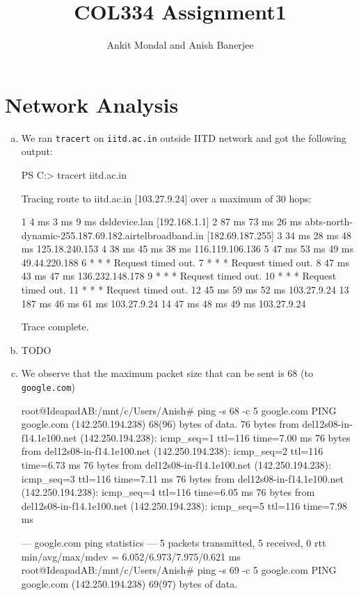\documentclass{article}
\title{COL334 Assignment1}
\author{Ankit Mondal and Anish Banerjee}
\begin{document}
\maketitle

\section{Network Analysis}
\begin{enumerate}[a.]
    \item We ran {\tt tracert} on {\tt iitd.ac.in} outside IITD network and got the following output:
    \begin{code}
PS C:\Users\Anish> tracert iitd.ac.in

Tracing route to iitd.ac.in [103.27.9.24]
over a maximum of 30 hops:

 1    4 ms    3 ms    9 ms dsldevice.lan [192.168.1.1]
 2   87 ms   73 ms   26 ms abts-north-dynamic-255.187.69.182.airtelbroadband.in [182.69.187.255]
 3   34 ms   28 ms   48 ms 125.18.240.153
 4   38 ms   45 ms   38 ms 116.119.106.136
 5   47 ms   53 ms   49 ms 49.44.220.188
 6    *       *       *    Request timed out.
 7    *       *       *    Request timed out.
 8   47 ms   43 ms   47 ms 136.232.148.178
 9    *       *       *    Request timed out.
10    *       *       *    Request timed out.
11    *       *       *    Request timed out.
12   45 ms   59 ms   52 ms 103.27.9.24
13  187 ms   46 ms   61 ms 103.27.9.24
14   47 ms   48 ms   49 ms 103.27.9.24

Trace complete.
    \end{code}
    \item TODO
    \item We observe that the maximum packet size that can be sent is 68 (to {\tt google.com})
\begin{code}
root@IdeapadAB:/mnt/c/Users/Anish# ping -s 68 -c 5 google.com
PING google.com (142.250.194.238) 68(96) bytes of data.
76 bytes from del12s08-in-f14.1e100.net (142.250.194.238): icmp_seq=1 ttl=116 time=7.00 ms
76 bytes from del12s08-in-f14.1e100.net (142.250.194.238): icmp_seq=2 ttl=116 time=6.73 ms
76 bytes from del12s08-in-f14.1e100.net (142.250.194.238): icmp_seq=3 ttl=116 time=7.11 ms
76 bytes from del12s08-in-f14.1e100.net (142.250.194.238): icmp_seq=4 ttl=116 time=6.05 ms
76 bytes from del12s08-in-f14.1e100.net (142.250.194.238): icmp_seq=5 ttl=116 time=7.98 ms

--- google.com ping statistics ---
5 packets transmitted, 5 received, 0%
rtt min/avg/max/mdev = 6.052/6.973/7.975/0.621 ms
root@IdeapadAB:/mnt/c/Users/Anish# ping -s 69 -c 5 google.com
PING google.com (142.250.194.238) 69(97) bytes of data.


\end{code}
\end{enumerate}
\end{document}
